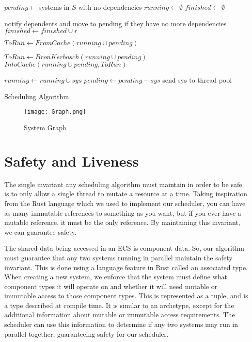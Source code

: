 \documentclass[conference]{IEEEtran}
\begin{document}
\begin{algorithm}

$pending \gets $systems in $S$ with no dependencies\;
$running \gets \emptyset$\;
$finished \gets \emptyset$\;

 {
     {
         {
            notify dependents and move to pending if they have no more dependencies\;
            $finished \gets finished \cup r$\;
        }
    }
    
    $ToRun \gets FromCache(running \cup pending)$\;
    
     {
        $ToRun \gets BronKerbosch(running \cup pending)$\;
        $IntoCache(running \cup pending, ToRun)$\;
    }
    
     {
        $running \gets running \cup sys$\;
        $pending \gets pending - sys$\;
        send sys to thread pool\;
    }
}

\caption{Scheduling Algorithm}
\end{algorithm}

\begin{figure}
    \begin{center}
    \centerline{\texttt{[image: Graph.png]}}
    \caption[test]{System Graph}
    \label{ECS Archetype}
    \end{center}
\end{figure}

\section{Safety and Liveness}

The single invariant any scheduling algorithm must maintain in order to be safe is to only allow a single thread to mutate a resource at a time. Taking inspiration from the Rust language which we used to implement our scheduler, you can have as many immutable references to something as you want, but if you ever have a mutable reference, it must be the only reference. By maintaining this invariant, we can guarantee safety.

The shared data being accessed in an ECS is component data. So, our algorithm must guarantee that any two systems running in parallel maintain the safety invariant. This is done using a language feature in Rust called an associated type. When creating a new system, we enforce that the system must define what component types it will operate on and whether it will need mutable or immutable access to those component types. This is represented as a tuple, and is a type described at compile time. It is similar to an archetype, except for the additional information about mutable or immutable access requirements. The scheduler can use this information to determine if any two systems may run in parallel together, guaranteeing safety for our scheduler.
\end{document}
